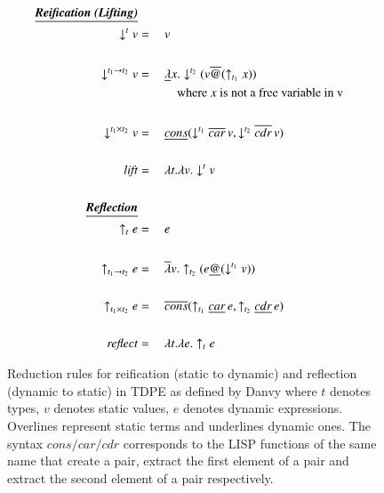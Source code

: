\documentclass[a4paper,12pt,twoside,openright]{report}
\theoremstyle{definition}
\begin{document}
\newpage
\begin{figure}[htp!]
    \centering
    \begin{alignat}{2}
        \text{\underline{\textbf{\emph{Reification (Lifting)}}}}\nonumber \\
        \downarrow^{t} v & = \: && v \\
        \nonumber \\%
        \downarrow^{t_{1} \rightarrow t_{2}} v & = \: && \underline{\lambda} x.\downarrow^{t_{2}}(v\overline{@}(\uparrow_{t_{1}} x)) \\
        & && \quad\text{where $x$ is not a free variable in v} \nonumber \\
        \nonumber \\%
        \downarrow^{t_{1} \times t_{2}} v & = \: && \underline{cons}(\downarrow^{t_{1}} \overline{car} \, v, \downarrow^{t_{2}} \overline{cdr} \, v) \\
        \nonumber \\%
        \mathit{lift} & = \: && \lambda t. \lambda v. \downarrow^{t} v \\
        \nonumber \\%
        \text{\underline{\textbf{\emph{Reflection}}}}\nonumber \\
        \uparrow_{t} e & = \: && e \\
        \nonumber \\%
        \uparrow_{t_{1} \rightarrow t_{2}} e & = \: && \overline{\lambda} v.\uparrow_{t_{2}}(e\underline{@}(\downarrow^{t_{1}} v)) \\
        \nonumber \\%
        \uparrow_{t_{1} \times t_{2}} e & = \: && \overline{cons}(\uparrow_{t_{1}} \underline{car} \, e, \uparrow_{t_{2}} \underline{cdr} \, e) \\
        \nonumber \\%
        \mathit{reflect} & = \: && \lambda t. \lambda e. \uparrow_{t} e
    \end{alignat}
    \caption{Reduction rules for reification (static to dynamic) and reflection (dynamic to static) in TDPE as defined by Danvy \cite{danvy1999type} where $t$ denotes types, $v$ denotes static values, $e$ denotes dynamic expressions. Overlines represent static terms and underlines dynamic ones. The syntax $cons/car/cdr$ corresponds to the LISP functions of the same name that create a pair, extract the first element of a pair and extract the second element of a pair respectively.}
    \label{fig:tdpe_rules}
\end{figure}
\newpage
\end{document}
